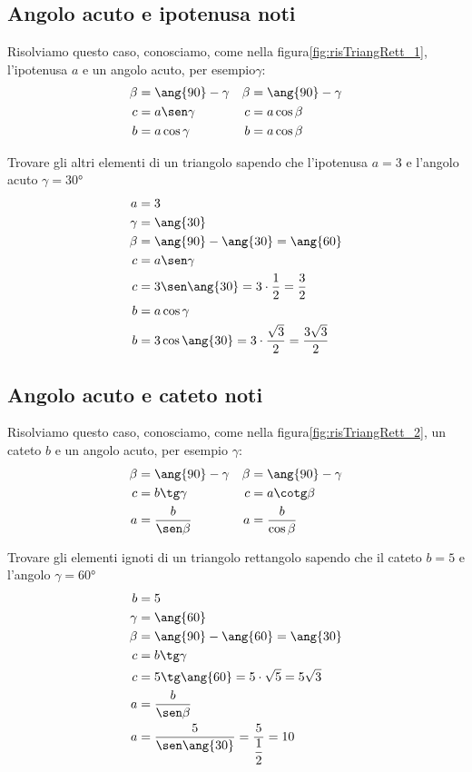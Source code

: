 \subsection{Angolo acuto e ipotenusa noti}
Risolviamo questo caso, conosciamo, come nella figura\nobs\vref*{fig:risTriangRett_1}, l'ipotenusa $a$ e un angolo acuto, per esempio\nobs$\gamma$:
\begin{align*}
\beta&=\ang{90}-\gamma&\beta&=\ang{90}-\gamma\\
c&=a\sen\gamma&c&=a\cos\beta\\
b&=a\cos\gamma&b&=a\cos\beta
\end{align*}
\begin{esempio}
Trovare gli altri elementi di un triangolo sapendo che l'ipotenusa $a=3$ e l'angolo acuto $\gamma=\ang{30}$ 
\begin{align*}
a&=3\\
\gamma&=\ang{30}\\
\beta&=\ang{90}-\ang{30}=\ang{60}\\
c&=a\sen\gamma\\
c&=3\sen\ang{30}=3\cdot\dfrac{1}{2}=\dfrac{3}{2}\\
b&=a\cos\gamma\\
b&=3\cos\ang{30}=3\cdot\dfrac{\sqrt{3}}{2}=\dfrac{3\sqrt{3}}{2}
\end{align*}
\end{esempio}
\subsection{Angolo acuto e cateto noti}
Risolviamo questo caso, conosciamo, come nella figura\nobs\vref*{fig:risTriangRett_2}, un cateto $b$ e un angolo acuto, per esempio $\gamma$:
\begin{align*}
\beta&=\ang{90}-\gamma&\beta&=\ang{90}-\gamma\\
c&=b\tg\gamma&c&=a\cotg\beta\\
a&=\dfrac{b}{\sen\beta}&a&=\dfrac{b}{\cos\beta}
\end{align*}
\begin{esempio}
Trovare gli elementi ignoti di un triangolo rettangolo sapendo che  il cateto $b=5$ e l'angolo $\gamma=\ang{60}$
\begin{align*}
b&=5\\
\gamma &=\ang{60}\\
\beta&=\ang{90}-\ang{60}=\ang{30}\\
c&=b\tg\gamma\\
c&=5\tg\ang{60}=5\cdot\sqrt{5}=5\sqrt{3}\\
a&=\dfrac{b}{\sen\beta}\\
a&=\dfrac{5}{\sen\ang{30}}=\dfrac{5}{\dfrac{1}{2}}=10
\end{align*}
\end{esempio}
